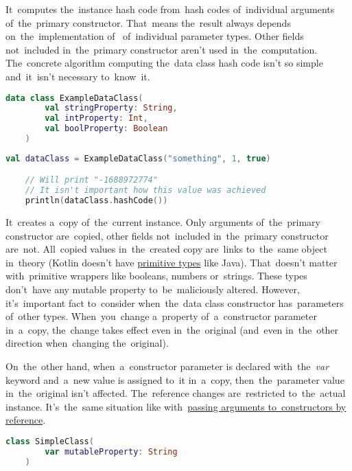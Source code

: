 \label{kotlindataclasshashcode}
It~computes the~instance hash code from~hash codes of~individual arguments of~the~primary constructor.
That~means the~result always depends on~the~implementation \mbox{of } of~individual parameter types.
Other fields not~included in~the~primary constructor aren't used in~the~computation.
The~concrete algorithm computing the~data class hash code isn't so simple and~it~isn't necessary to~know~it.

\example
\begin{lstlisting}[language=Kotlin, title={Data class}]
    data class ExampleDataClass(
        val stringProperty: String,
        val intProperty: Int,
        val boolProperty: Boolean
    )
\end{lstlisting}
\begin{lstlisting}[language=Kotlin, title={\itq{hashCode} behavior}]
    val dataClass = ExampleDataClass("something", 1, true)

    // Will print "-1688972774"
    // It isn't important how this value was achieved
    println(dataClass.hashCode())
\end{lstlisting}

\label{kotlindataclasscopy}
It~creates a~copy of~the~current instance.
Only arguments of~the~primary constructor are~copied, other fields not~included in~the~primary constructor are~not.
All~copied values in~the~created copy are~links to~the~same object in~theory (Kotlin doesn't have \hyperref[javaprimitivetypes]{primitive types} like Java).
That~doesn't matter with~primitive wrappers like booleans, numbers or~strings.
These types don't~have any mutable property to~be~maliciously altered.
However, it's~important fact to~consider when~the~data class constructor has~parameters of~other types.
When~you~change a~property of~a~constructor parameter in~a~copy, the~change takes effect even in~the~original (and~even in~the~other direction when~changing the~original).

On~the~other hand, when~a~constructor parameter is declared \mbox{with the \textit{var}} keyword and~a~new value is assigned to~it in~a~copy, then~the~parameter value in~the~original isn't affected.
The~reference changes are~restricted to~the~actual instance.
It's~the~same situation like with~\hyperref[kotlinvalvar]{passing arguments to~constructors by reference}.

\example
\begin{lstlisting}[language=Kotlin, title={A class with mutable property}]
    class SimpleClass(
        var mutableProperty: String
    )
\end{lstlisting}
\newpage

